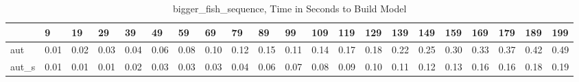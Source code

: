 \begin{table}
\caption{bigger_fish_sequence, Time in Seconds to Build Model}
\label{bigger_fish_sequence_model_time}
\begin{tabular}{lllllllllllllllllllll}
\toprule
 & 9 & 19 & 29 & 39 & 49 & 59 & 69 & 79 & 89 & 99 & 109 & 119 & 129 & 139 & 149 & 159 & 169 & 179 & 189 & 199 \\
\midrule
aut & 0.01 & 0.02 & 0.03 & 0.04 & 0.06 & 0.08 & 0.10 & 0.12 & 0.15 & 0.11 & 0.14 & 0.17 & 0.18 & 0.22 & 0.25 & 0.30 & 0.33 & 0.37 & 0.42 & 0.49 \\
aut_s & 0.01 & 0.01 & 0.01 & 0.02 & 0.03 & 0.03 & 0.03 & 0.04 & 0.06 & 0.07 & 0.08 & 0.09 & 0.10 & 0.11 & 0.12 & 0.13 & 0.16 & 0.16 & 0.18 & 0.19 \\
\bottomrule
\end{tabular}
\end{table}
